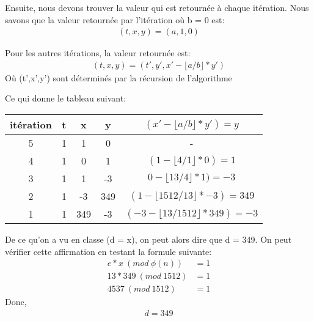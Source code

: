 \documentclass[devoir4.tex]{subfiles}
\begin{document}
Ensuite, nous devons trouver la valeur qui est retournée à chaque itération. Nous savons que la valeur retournée par l'itération où b = 0 est:
\begin{align*}
	(t,x,y) = (a,1,0)
\end{align*}

\newpage
Pour les autres itérations, la valeur retournée est:
\begin{align*}
	(t,x,y) = (t', y', x' - \lfloor a/b \rfloor * y')
\end{align*}
Où (t',x',y') sont déterminés par la récursion de l'algorithme \newline

Ce qui donne le tableau suivant:
\begin{table}[H]
	\centering
	\vspace{0.5cm}
	\begin{tabular}{|c|c|c|c|c|}
		\hline
		itération 	& t 	  & x 		& y 		& \( (x' - \lfloor a/b \rfloor * y') = y \)\\ \hline
		5     		& 1       & 1		& 0     		& -	\\ \hline
		4   		& 1	  & 0		& 1    		& \( (1 - \lfloor 4/1 \rfloor * 0) = 1\)	\\ \hline
		3     		& 1    	  & 1		& -3		& \( 0 - \lfloor 13/4 \rfloor * 1) = -3\)		\\ \hline
		2     		& 1       & -3             &  349  	& \( (1 - \lfloor 1512/13 \rfloor * -3) = 349\)	\\ \hline
		1     		& 1       & 349           &  -3   	& \( (-3 - \lfloor 13/1512 \rfloor * 349) = -3\)	\\ \hline
	\end{tabular}
\end{table}

De ce qu'on a vu en classe (d = x), on peut alors dire que d = 349. On peut vérifier cette affirmation en testant la formule suivante:
\begin{align*}
	e*x \: (mod \: \phi(n) ) &= 1 \\
	13 * 349 \: (mod \: 1512) &= 1 \\
	4537 \: (mod \: 1512) &= 1
\end{align*}\newline
Donc,
\begin{align*}
	d = 349
\end{align*}
\end{document}

